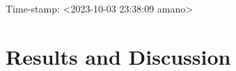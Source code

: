 Time-stamp: <2023-10-03 23:38:09 amano>







\maketitle





\section{Results and Discussion}














